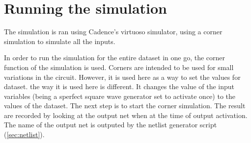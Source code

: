 \section{Running the simulation}\label{sec:run}

The simulation is ran using Cadence's virtuoso simulator, using a corner simulation to simulate all the inputs.

In order to run the simulation for the entire dataset in one go, the corner function of the simulation is used. Corners are intended to be used for small variations in the circuit. However, it is used here as a way to set the values for dataset.
the way it is used here is different. It changes the value of the input variables (being a sperfect square wave generator set to activate once) to the values of the dataset. The next step is to start the corner simulation. The result are recorded by looking at the output net when at the time of output activation. The name of the output net is outputed by the netlist generator script (\cref{sec:netlist}).
